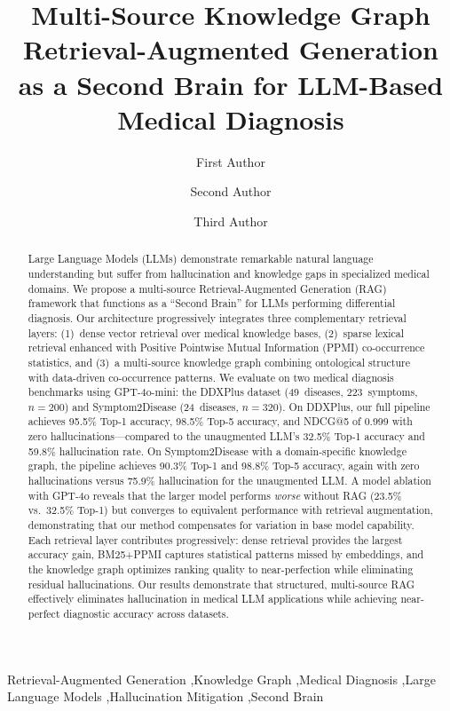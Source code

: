 \documentclass[review]{elsarticle}
\begin{document}
\begin{frontmatter}

\title{Multi-Source Knowledge Graph Retrieval-Augmented Generation\\as a Second Brain for LLM-Based Medical Diagnosis}

\author[addr1]{First Author}
\author[addr1]{Second Author}
\author[addr1]{Third Author}

\address[addr1]{Department of Computer Science, University, Country}

\begin{abstract}
Large Language Models (LLMs) demonstrate remarkable natural language understanding but suffer from hallucination and knowledge gaps in specialized medical domains. We propose a multi-source Retrieval-Augmented Generation (RAG) framework that functions as a ``Second Brain'' for LLMs performing differential diagnosis. Our architecture progressively integrates three complementary retrieval layers: (1)~dense vector retrieval over medical knowledge bases, (2)~sparse lexical retrieval enhanced with Positive Pointwise Mutual Information (PPMI) co-occurrence statistics, and (3)~a multi-source knowledge graph combining ontological structure with data-driven co-occurrence patterns. We evaluate on two medical diagnosis benchmarks using GPT-4o-mini: the DDXPlus dataset (49~diseases, 223~symptoms, $n{=}200$) and Symptom2Disease (24~diseases, $n{=}320$). On DDXPlus, our full pipeline achieves 95.5\% Top-1 accuracy, 98.5\% Top-5 accuracy, and NDCG@5 of 0.999 with zero hallucinations---compared to the unaugmented LLM's 32.5\% Top-1 accuracy and 59.8\% hallucination rate. On Symptom2Disease with a domain-specific knowledge graph, the pipeline achieves 90.3\% Top-1 and 98.8\% Top-5 accuracy, again with zero hallucinations versus 75.9\% hallucination for the unaugmented LLM. A model ablation with GPT-4o reveals that the larger model performs \emph{worse} without RAG (23.5\% vs.\ 32.5\% Top-1) but converges to equivalent performance with retrieval augmentation, demonstrating that our method compensates for variation in base model capability. Each retrieval layer contributes progressively: dense retrieval provides the largest accuracy gain, BM25+PPMI captures statistical patterns missed by embeddings, and the knowledge graph optimizes ranking quality to near-perfection while eliminating residual hallucinations. Our results demonstrate that structured, multi-source RAG effectively eliminates hallucination in medical LLM applications while achieving near-perfect diagnostic accuracy across datasets.
\end{abstract}

\begin{keyword}
Retrieval-Augmented Generation \sep Knowledge Graph \sep Medical Diagnosis \sep Large Language Models \sep Hallucination Mitigation \sep Second Brain
\end{keyword}

\end{frontmatter}
\end{document}
